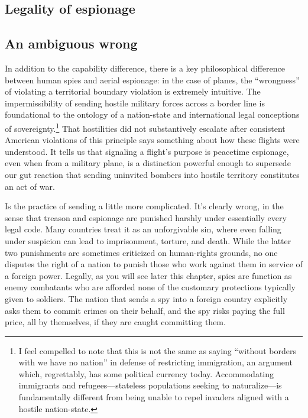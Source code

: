 \documentclass{memoir}
\begin{document}
\begin{refsegment}
\section{Legality of espionage}
\subsection{An ambiguous wrong}
In addition to the capability difference, there is a key philosophical difference between human spies and aerial espionage: in the case of planes, the ``wrongness'' of violating a territorial boundary violation is extremely intuitive. The impermissibility of sending hostile military forces across a border line is foundational to the ontology of a nation-state and international legal conceptions of sovereignty.\footnote{I feel compelled to note that this is not the same as saying ``without borders with we have no nation'' in defense of restricting immigration, an argument which, regrettably, has some political currency today. Accommodating immigrants and refugees---stateless populations seeking to naturalize---is fundamentally different from being unable to repel invaders aligned with a hostile nation-state.} That hostilities did not substantively escalate after consistent American violations of this principle says something about how these flights were understood. It tells us that signaling a flight's purpose is peacetime espionage, even when from a military plane, is a distinction powerful enough to supersede our gut reaction that sending uninvited bombers into hostile territory constitutes an act of war.

Is the practice of sending a little more complicated. It's clearly wrong, in the sense that treason and espionage are punished harshly under essentially every legal code. Many countries treat it as an unforgivable sin, where even falling under suspicion can lead to imprisonment, torture, and death. While the latter two punishments are sometimes criticized on human-rights grounds, no one disputes the right of a nation to punish those who work against them in service of a foreign power. Legally, as you will see later this chapter, spies are function as enemy combatants who are afforded none of the customary protections typically given to soldiers. The nation that sends a spy into a foreign country explicitly asks them to commit crimes on their behalf, and the spy risks paying the full price, all by themselves, if they are caught committing them.


\end{refsegment}
\end{document}
